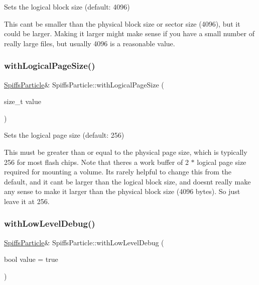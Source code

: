 Sets the logical block size (default\+: 4096) 

This can\textquotesingle{}t be smaller than the physical block size or sector size (4096), but it could be larger. Making it larger might make sense if you have a small number of really large files, but usually 4096 is a reasonable value. \mbox{\label{class_spiffs_particle_afb7595fab7db056f0c4594ee5fa2cd48}} 
\subsubsection{\texorpdfstring{with\+Logical\+Page\+Size()}{withLogicalPageSize()}}
{\footnotesize\ttfamily \mbox{\hyperlink{class_spiffs_particle}{Spiffs\+Particle}}\& Spiffs\+Particle\+::with\+Logical\+Page\+Size (\begin{DoxyParamCaption}\item[{size\+\_\+t}]{value }\end{DoxyParamCaption})\hspace{0.3cm}{\ttfamily [inline]}}



Sets the logical page size (default\+: 256) 

This must be greater than or equal to the physical page size, which is typically 256 for most flash chips. Note that there\textquotesingle{}s a work buffer of 2 $\ast$ logical page size required for mounting a volume. It\textquotesingle{}s rarely helpful to change this from the default, and it can\textquotesingle{}t be larger than the logical block size, and doesn\textquotesingle{}t really make any sense to make it larger than the physical block size (4096 bytes). So just leave it at 256. \mbox{\label{class_spiffs_particle_a12f034a87b98381d976f81885b66b87a}} 
\subsubsection{\texorpdfstring{with\+Low\+Level\+Debug()}{withLowLevelDebug()}}
{\footnotesize\ttfamily \mbox{\hyperlink{class_spiffs_particle}{Spiffs\+Particle}}\& Spiffs\+Particle\+::with\+Low\+Level\+Debug (\begin{DoxyParamCaption}\item[{bool}]{value = {\ttfamily true} }\end{DoxyParamCaption})\hspace{0.3cm}{\ttfamily [inline]}}



